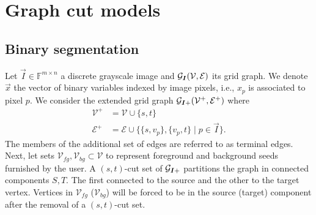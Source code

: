 \section{Graph cut models}
\label{ch2:sec:graph-cut-models}


\subsection{Binary segmentation}

Let $\vec{I} \in \mathbb{F}^{m\times n}$ a discrete grayscale image and $\mathcal{G}_{\bm{I}} (\mathcal{V},\mathcal{E})$ its grid graph. We denote $\vec{x}$ the vector of binary variables indexed by image pixels, i.e., $x_p$ is associated to pixel $p$. We consider the extended grid graph $\mathcal{G}_{\bm{I}+} (\mathcal{V}^+,\mathcal{E}^+)$ where 
\begin{align*}
	\mathcal{V}^+ &= \mathcal{V} \cup \{s,t\} \\
	\mathcal{E}^+ &= \mathcal{E} \cup \big\{ \{s,v_p\}, \{v_p,t\} \; | \; p \in \vec{I} \big\}.
\end{align*}
The members of the additional set of edges are referred to as terminal edges. Next, let sets $\mathcal{V}_{fg}, \mathcal{V}_{bg} \subset \mathcal{V}$ to represent foreground and background seeds furnished by the user. A $(s,t)$-cut set of $\mathcal{G}_{\bm{I}+}$ partitions the graph in connected components $S,T$. The first connected to the source and the other to the target vertex. Vertices in $\mathcal{V}_{fg}$ ($\mathcal{V}_{bg}$) will be forced to be in the source (target) component after the removal of a $(s,t)$-cut set.

